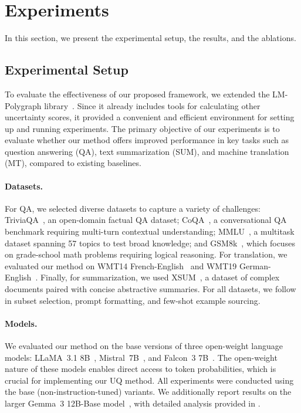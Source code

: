 \section{Experiments}
\label{sec:experiments}

In this section, we present the experimental setup, the results, and the ablations.

\subsection{Experimental Setup}
\label{sec:experimental_setup}

To evaluate the effectiveness of our proposed framework, we extended the LM-Polygraph library~\cite{vashurin2025lmpolygraph,fadeeva2023lmpolygraph}. Since it already includes tools for calculating other uncertainty scores, it provided a convenient and efficient environment for setting up and running experiments. The primary objective of our experiments is to evaluate whether our method offers improved performance in key tasks such as question answering (QA), text summarization (SUM), and machine translation (MT), compared to existing baselines.

\paragraph{Datasets.}
For QA, we selected diverse datasets to capture a variety of challenges: TriviaQA~\cite{joshi2017triviaqa}, an open-domain factual QA dataset; CoQA~\cite{reddy2019coqa}, a conversational QA benchmark requiring multi-turn contextual understanding; MMLU~\cite{hendrycks2021mmlu}, a multitask dataset spanning 57 topics to test broad knowledge; and GSM8k~\cite{cobbe2021gsm8k}, which focuses on grade-school math problems requiring logical reasoning. For translation, we evaluated our method on WMT14 French-English~\cite{bojar2014wmt14} and WMT19 German-English~\cite{barrault2019wmt19}. Finally, for summarization, we used XSUM~\cite{narayan2018xsum}, a dataset of complex documents paired with concise abstractive summaries. For all datasets, we follow~\cite{vashurin2025lmpolygraph} in subset selection, prompt formatting, and few-shot example sourcing.

\paragraph{Models.}
We evaluated our method on the base versions of three open-weight language models: LLaMA~3.1 8B~\cite{touvron2023llama}, Mistral~7B~\cite{jiang2023mistral}, and Falcon~3 7B~\cite{falcon2024}. The open-weight nature of these models enables direct access to token probabilities, which is crucial for implementing our UQ method. All experiments were conducted using the base (non-instruction-tuned) variants. We additionally report results on the larger Gemma~3 12B-Base model~\cite{gemma2025}, with detailed analysis provided in .

